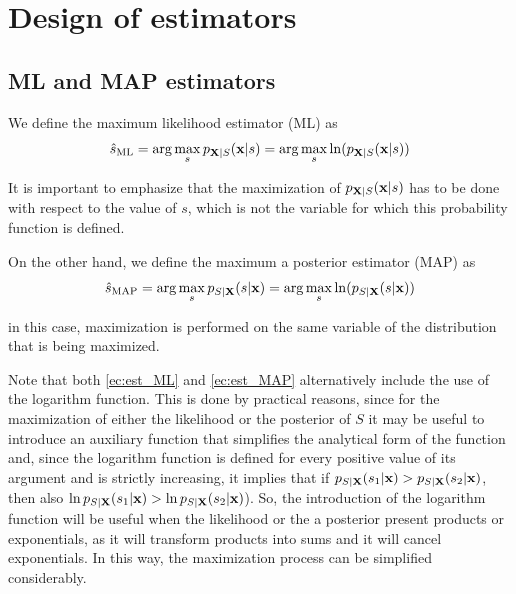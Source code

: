 \section{Design of estimators}

\subsection{ML and MAP estimators}

We define the maximum likelihood estimator (ML) as
\begin{equation}
\hat s_{\text{ML}} = \arg\max_{s} p_{{\bf X}|S}({\bf x}|s)
                   = \arg\max_{s} \ln(p_{{\bf X}|S}({\bf x}|s))
                    \label{ec:est_ML}
\end{equation}

It is important to emphasize that the maximization of $p_{{\bf X}|S}({\bf x}|s)$ has to be done with respect to the value of $s$, which is not the variable for which this probability function is defined. %

On the other hand, we define the maximum a posterior estimator (MAP) as
\begin{equation}
\hat s_{\text{MAP}} = \arg\max_{s} p_{{S|\bf X}}(s|{\bf x})
                   = \arg\max_{s} \ln(p_{{S|\bf X}}(s|{\bf x}))
                   \label{ec:est_MAP}
\end{equation}

in this case, maximization is performed on the same variable of the distribution that is being maximized. 

Note that both \eqref{ec:est_ML} and \eqref{ec:est_MAP} alternatively include the use of the logarithm function. This is done by practical reasons, since for the maximization of either the likelihood or the posterior of $S$ it may be useful to introduce an auxiliary function that simplifies the analytical form of the function and, since the logarithm function is defined for every positive value of its argument and is strictly increasing, it implies that if $p_{S|{\bf X}}(s_1|{\bf x}) > p_{S|{\bf X}}(s_2|{\bf x})$, then also $\ln p_{S|{\bf X}}(s_1|{\bf x}) > \ln p_{S|{\bf X}}(s_2|{\bf x})$). So, the introduction of the logarithm function will be useful when the likelihood or the a posterior  present products or exponentials, as it will transform products into sums and it will cancel exponentials. In this way, the maximization process can be simplified considerably.

